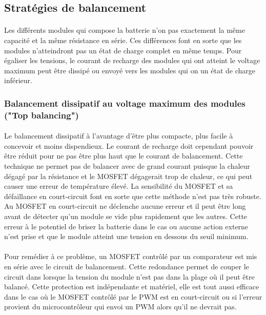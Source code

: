 


\subsection{Stratégies de balancement}
\paragraph*{}
Les différents modules qui compose la batterie n'on pas exactement la même capacité et la même résistance en série. Ces différences font en sorte que les modules n'atteindront pas un état de charge complet en même temps. Pour égaliser les tensions, le courant de recharge des modules qui ont atteint le voltage maximum peut être dissipé ou envoyé vers les modules qui on un état de charge inférieur. 

\subsubsection*{Balancement dissipatif au voltage maximum des modules ("Top balancing")}
\paragraph*{}
Le balancement dissipatif à l'avantage d'être plus compacte, plus facile à concevoir et moins dispendieux. Le courant de recharge doit cependant pouvoir être réduit pour ne pas être plus haut que le courant de balancement. Cette technique ne permet pas de balancer avec de grand courant puisque la chaleur dégagé par la résistance et le MOSFET dégagerait trop de chaleur, ce qui peut causer une erreur de température élevé. La sensibilité du MOSFET et sa défaillance en court-circuit font en sorte que cette méthode n'est pas très robuste. Au MOSFET en court-circuit ne déclenche aucune erreur et il peut être long avant de détecter qu'un module se vide plus rapidement que les autres. Cette erreur à le potentiel de briser la batterie dans le cas ou aucune action externe n'est prise et que le module atteint une tension en dessous du seuil minimum.

\paragraph*{}
Pour remédier à ce problème, un MOSFET contrôlé par un comparateur est mis en série avec le circuit de balancement. Cette redondance permet de couper le circuit dans lorsque la tension du module n'est pas dans la plage où il peut être balancé. Cette protection est indépendante et matériel, elle est tout aussi efficace dans le cas où le MOSFET contrôlé par le PWM est en court-circuit ou si l'erreur provient du microcontrôleur qui envoi un PWM alors qu'il ne devrait pas.

